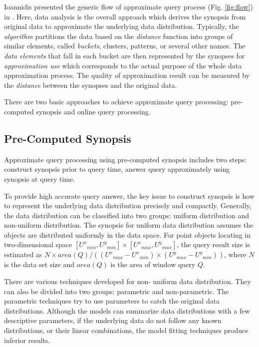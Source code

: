 \documentclass[twocolumn]{article}
\begin{document}
Ioannidis presented the generic flow of approximate query process (Fig. \ref{fig:flow}) in \cite{Ioannidis:2003-b}. Here, data analysis is the overall approach which derives the synopsis from original data to approximate the underlying data distribution. 
Typically, the \textit{algorithm} partitions the data based on the \textit{distance} function into groups of similar elements, called \textit{buckets}, clusters, patterns, or several other names. The \textit{data elements} that fall in each bucket are then represented by the synopses for \textit{approximation use} which corresponds to the actual purpose of the whole data approximation process. The quality of approximation result can be measured by the \textit{distance} between the synopses and the original data.

There are two basic approaches to achieve approximate query processing: pre-computed synopsis and online query processing.

\subsection{Pre-Computed Synopsis}

Approximate query processing using pre-computed synopsis includes two steps: construct synopsis prior to query time, answer query approximately using synopsis at query time.

To provide high accurate query answer, the key issue to construct synopsis is how to represent the underlying data distribution precisely and compactly. Generally, the data distribution can be classified into two groups: uniform distribution and non-uniform distribution. The synopsis for uniform data distribution assumes the objects are distributed uniformly in the data space. For point objects locating in two-dimensional space $[{U^x}_{min}, {U^y}_{min}] \times [{U^x}_{max}, {U^y}_{max}]$, the query result size is estimated as 
$N \times \textit{area}(Q)/(({U^x}_{max} - {U^x}_{min}) \times ({U^y}_{max} - {U^y}_{min}))$, where $N$ is the data set size and $\textit{area}(Q)$ is the area of window query $Q$.

There are various techniques developed for non- uniform data distribution. They can also be divided into two groups: parametric and non-parametric. The parametric techniques try to use parameters to catch the original data distributions. Although the models can summarize data distributions with a few descriptive parameters, if the underlying data do not follow any known distributions, or their linear combinations, the model fitting techniques produce inferior results.
\end{document}
